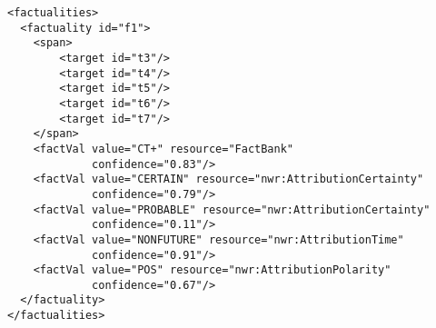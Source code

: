\begin{Verbatim}[fontsize=\small]
<factualities>
  <factuality id="f1">
    <span>
        <target id="t3"/>
        <target id="t4"/>
        <target id="t5"/>
        <target id="t6"/>
        <target id="t7"/>
    </span>
    <factVal value="CT+" resource="FactBank" 
             confidence="0.83"/>
    <factVal value="CERTAIN" resource="nwr:AttributionCertainty" 
             confidence="0.79"/>
    <factVal value="PROBABLE" resource="nwr:AttributionCertainty"
             confidence="0.11"/>
    <factVal value="NONFUTURE" resource="nwr:AttributionTime"
             confidence="0.91"/>
    <factVal value="POS" resource="nwr:AttributionPolarity"
             confidence="0.67"/>
  </factuality>
</factualities>
\end{Verbatim}


